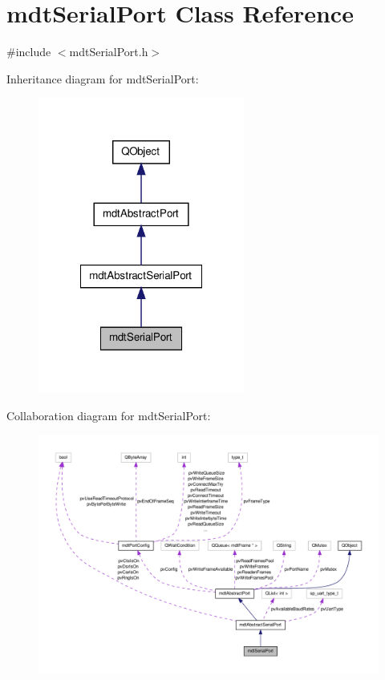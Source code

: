 \hypertarget{classmdt_serial_port}{\section{mdt\-Serial\-Port Class Reference}
\label{classmdt_serial_port}
}


{\ttfamily \#include $<$mdt\-Serial\-Port.\-h$>$}



Inheritance diagram for mdt\-Serial\-Port\-:\nopagebreak
\begin{figure}[H]
\begin{center}
\leavevmode
\includegraphics[width=192pt]{classmdt_serial_port__inherit__graph}
\end{center}
\end{figure}


Collaboration diagram for mdt\-Serial\-Port\-:\nopagebreak
\begin{figure}[H]
\begin{center}
\leavevmode
\includegraphics[width=350pt]{classmdt_serial_port__coll__graph}
\end{center}
\end{figure}
